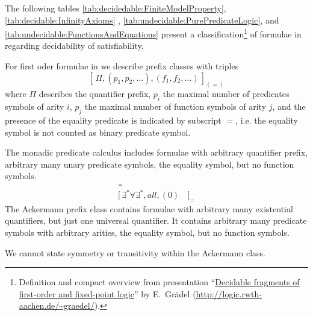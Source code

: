 
The following tables 
\ref{tab:decidedable:FiniteModelProperty}, 
\ref{tab:decidable:InfinityAxioms} ,
\ref{tab:undecidable:PurePredicateLogic}, and
\ref{tab:undecidable:FunctionsAndEquations}
present a classification\footnote{
	Definition and compact overview from presentation
	“\href{http://logic.rwth-aachen.de/~graedel/kalmar.pdf}{Decidable fragments of first-order and fixed-point logic}”
	by E.~Grädel (\url{http://logic.rwth-aachen.de/~graedel/}).	
} 
of formulae in \PNF
regarding decidability of satisfiability. 

\begin{definition}\label{def:prefix:class}
	For first oder formulae in \PNF we describe prefix classes with triples
	\[
		[\, \Pi, (p_1,p_2,\ldots), (f_1,f_2,\ldots)\,]_{(=)}
	\]
	where $\Pi$ describes the quantifier prefix,
	$p_i$ the maximal number of predicates symbols of arity $i$,
	$p_j$ the maximal number of function symbols of arity $j$,
	and the presence of the equality predicate is indicated by subscript $=$,
	i.e. the equality symbol is not counted as binary predicate symbol.
\end{definition}

\begin{example}
	The monadic predicate calculus includes formulae with arbitrary quantifier prefix, 
	arbitrary many unary predicate symbols, the equality symbol, but no function symbols.
	\begin{align*}
		[\,all, (\omega), (0 )&\,]_= \tag{Löwenheim 1925, Kalmár 1929}
	\\
	[\,\exists^*\forall\exists^*,all,(0)&\,]_= \tag{Ackermann 1928}
	\end{align*}
	The Ackermann prefix class contains formulae with arbitrary many existential quantifiers, 
	but just one universal quantifier. It contains arbitrary many predicate symbols
	with arbitrary arities, the equality symbol, but no function symbols.
\end{example}

\begin{remark}
	We cannot state symmetry or transitivity within the Ackermann class.
\end{remark}


